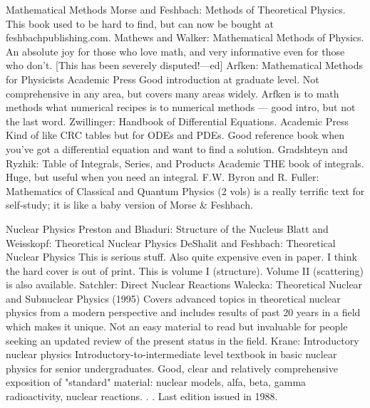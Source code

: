 \documentclass[10pt,a4paper]{book}
\theoremstyle{definition}
\begin{document}
Mathematical Methods
Morse and Feshbach: Methods of Theoretical Physics.  This book used to be hard to find, but can now be bought at feshbachpublishing.com.
Mathews and Walker: Mathematical Methods of Physics.  An absolute joy for those who love math, and very informative even for those who don't.  [This has been severely disputed!—ed]
Arfken: Mathematical Methods for Physicists Academic Press
Good introduction at graduate level.  Not comprehensive in any area, but covers many areas widely.  Arfken is to math methods what numerical recipes is to numerical methods — good intro, but not the last word.
Zwillinger: Handbook of Differential Equations. Academic Press
Kind of like CRC tables but for ODEs and PDEs.  Good reference book when you've got a differential equation and want to find a solution.
Gradshteyn and Ryzhik: Table of Integrals, Series, and Products Academic
THE book of integrals.  Huge, but useful when you need an integral.
F.W. Byron and R. Fuller: Mathematics of Classical and Quantum Physics (2 vols)
is a really terrific text for self-study; it is like a baby version of Morse \& Feshbach.



Nuclear Physics
Preston and Bhaduri: Structure of the Nucleus
Blatt and Weisskopf: Theoretical Nuclear Physics
DeShalit and Feshbach: Theoretical Nuclear Physics
This is serious stuff.  Also quite expensive even in paper.  I think the hard cover is out of print.  This is volume I (structure).  Volume II (scattering) is also available.
Satchler: Direct Nuclear Reactions
Walecka: Theoretical Nuclear and Subnuclear Physics (1995)
Covers advanced topics in theoretical nuclear physics from a modern perspective and includes results of past 20 years in a field which makes it unique.  Not an easy material to read but invaluable for people seeking an updated review of the present status in the field.
Krane: Introductory nuclear physics
Introductory-to-intermediate level textbook in basic nuclear physics for senior undergraduates.  Good, clear and relatively comprehensive exposition of "standard" material: nuclear models, alfa, beta, gamma radioactivity, nuclear reactions. . .  Last edition issued in 1988.
\end{document}
